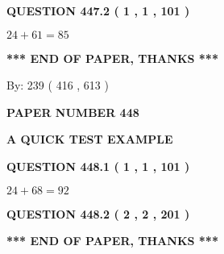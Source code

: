 \documentclass[12pt]{article}
\begin{document}
  
  
\vspace{0.2in}
  
{\textbf{\Large{QUESTION
447.2 
 ( 1 , 1 , 101 )
}}}
  
  
 
 

$ %
24 +  %
61=   %
85$
 
 
   
   
 \vspace{0.2in}
 
   
   
   
   
\vspace{1.0in} 
{\textbf{\large{ *** END OF PAPER, THANKS *** }}} 
   
   
\hspace{1.0in} By: 
 239 ( 416 ,  613 )
   
   
   
   
\newpage 
\setcounter{page}{ 
   448001 } 
   
   
   
   
 {\textbf{ \Large{ PAPER NUMBER  448  }}}
   
   
\vspace{0.2in}
   
   
   
   
   
   
 \vspace{0.2in}
{\LARGE {\textbf{ A QUICK TEST EXAMPLE}}}
   
   
  
\vspace{0.2in}
  
{\textbf{\Large{QUESTION
448.1 
 ( 1 , 1 , 101 )
}}}
  
  
 
 

$ %
24 +  %
68=   %
92$
 
 
  
\vspace{0.2in}
  
{\textbf{\Large{QUESTION
448.2 
 ( 2 , 2 , 201 )
}}}
  
  
   
   
 \vspace{0.2in}
 
   
   
   
   
\vspace{1.0in} 
{\textbf{\large{ *** END OF PAPER, THANKS *** }}} 
   
\end{document}
